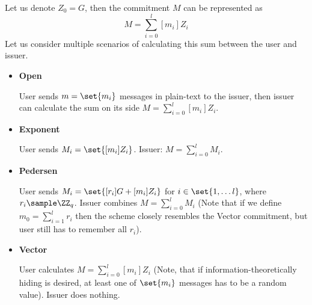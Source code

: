 \begin{remark}
Let us denote $Z_0 = G$, then the commitment $M$ can be represented as
$$ M = \textstyle \sum_{i=0}^l [m_i]Z_i $$
Let us consider multiple scenarios of calculating this sum between the user and issuer.
\begin{itemize}
    \item \textbf{Open}
    
    User sends $m = \set{m_i}$ messages in plain-text to the issuer, then issuer can calculate the sum on its side $ M = \sum_{i=0}^l [m_i]Z_i $.
    \item \textbf{Exponent}
    
    User sends $M_i = \set{[m_i]Z_i}$. Issuer: $M = \sum_{i=0}^l M_i$.
    \item \textbf{Pedersen}
    
    User sends $M_i = \set{[r_i]G + [m_i]Z_i}$ for $i \in \set{1, \dots l}$, where $r_i \sample \ZZ_q$. Issuer combines $M = \sum_{i=0}^l M_i$ (Note that if we define $m_0 = \sum_{i=1}^l r_i$ then the scheme closely resembles the Vector commitment, but user still has to remember all $r_i$).
    \item \textbf{Vector}
    
    User calculates $ M = \sum_{i=0}^l [m_i]Z_i $ (Note, that if information-theoretically hiding is desired, at least one of $\set{m_i}$ messages has to be a random value). Issuer does nothing.
\end{itemize}
\end{remark}



